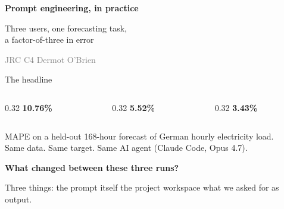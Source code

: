 \documentclass[aspectratio=169,11pt]{beamer}
\newcommand{\bignum}[3]{%
  \centering
  {\fontsize{40pt}{44pt}\selectfont\textbf{\textcolor{#1}{#2}}}\par
  \vspace{4pt}{\small\textbf{\textcolor{#1}{#3}}}\par
}
\begin{document}
{
\begin{frame}[plain]
  \vfill
  \begin{center}
    {\fontsize{36pt}{40pt}\selectfont\bfseries\textcolor{titlenavy}{Prompt engineering, in practice}}\par
    \vspace{10pt}
    {\Large\textcolor{gray!50!black}{Three users, one forecasting task,\\a factor-of-three in error}}
  \end{center}
  \vfill
  \begin{center}\small\textcolor{gray}{JRC C4 \quad{\textperiodcentered}\quad Dermot O'Brien \quad{\textperiodcentered}}\end{center}
\end{frame}}

\begin{frame}{The headline}
  \vspace{18pt}
  \begin{columns}[t,onlytextwidth]
    \begin{column}{0.32\textwidth}\bignum{l1grey}{10.76\%}{L1 --- beginner}\end{column}
    \begin{column}{0.32\textwidth}\bignum{l2dark}{5.52\%}{L2 --- average}\end{column}
    \begin{column}{0.32\textwidth}\bignum{l3orange}{3.43\%}{L3 --- pro}\end{column}
  \end{columns}
  \vfill
  \begin{center}\small\color{gray!40!black}
    MAPE on a held-out 168-hour forecast of German hourly electricity load.\\
    Same data. Same target. Same AI agent (Claude Code, Opus 4.7).
  \end{center}
  \vspace{12pt}
\end{frame}

\begin{frame}
  \vspace{1.2cm}
  \begin{center}
    {\fontsize{30pt}{34pt}\selectfont\bfseries What changed between these three runs?}
  \end{center}
  \vfill
  \begin{center}\large\color{gray!40!black}
    Three things: the prompt itself \quad\textperiodcentered\quad the project workspace
    \quad\textperiodcentered\quad what we asked for as output.
  \end{center}
  \vspace{1cm}
\end{frame}
\end{document}
